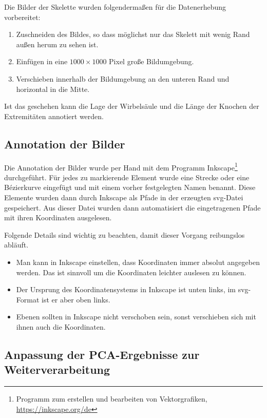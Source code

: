 Die Bilder der Skelette wurden folgendermaßen für die Datenerhebung vorbereitet:
 
 \begin{enumerate}
  \item Zuschneiden des Bildes, so dass möglichst nur das Skelett mit wenig Rand außen herum zu sehen ist.
  \item Einfügen in eine $1000 \times 1000$ Pixel große Bildumgebung.
  \item Verschieben innerhalb der Bildumgebung an den unteren Rand und horizontal in die Mitte.
 \end{enumerate}

 Ist das geschehen kann die Lage der Wirbelsäule und die Länge der Knochen der Extremitäten annotiert werden.
 
\subsection{Annotation der Bilder}

Die Annotation der Bilder wurde per Hand mit dem Programm Inkscape\footnote{Programm zum erstellen und bearbeiten von Vektorgrafiken, \url{https://inkscape.org/de}} durchgeführt. Für jedes zu markierende Element wurde eine Strecke oder eine Bézierkurve eingefügt und mit einem vorher festgelegten Namen benannt. Diese Elemente wurden dann durch Inkscape als Pfade in der erzeugten svg-Datei gespeichert. Aus dieser Datei wurden dann automatisiert die eingetragenen Pfade mit ihren Koordinaten ausgelesen.

Folgende Details sind wichtig zu beachten, damit dieser Vorgang reibungslos abläuft. 
\begin{itemize}
 \item Man kann in Inkscape einstellen, dass Koordinaten immer absolut angegeben werden. Das ist sinnvoll um die Koordinaten leichter auslesen zu können.
 \item Der Ursprung des Koordinatensystems in Inkscape ist unten links, im svg-Format ist er aber oben links.
 \item Ebenen sollten in Inkscape nicht verschoben sein, sonst verschieben sich mit ihnen auch die Koordinaten.  
\end{itemize}

\subsection{Anpassung der PCA-Ergebnisse zur Weiterverarbeitung}

